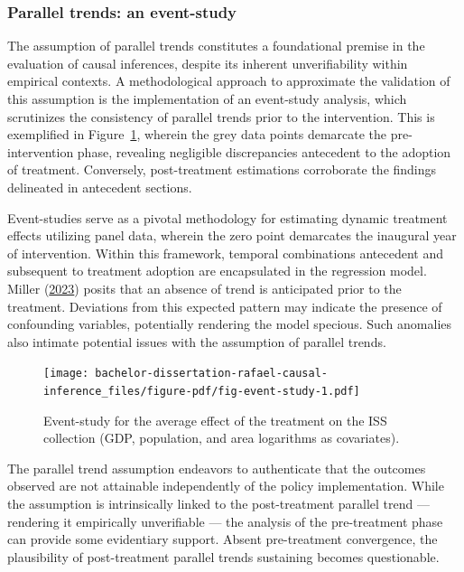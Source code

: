 \documentclass[12pt, a4paper, twoside]{article}
\numberwithin{equation}{subsection} %
\begin{document}
\hypertarget{sec-event-study}{%
\subsubsection{Parallel trends: an event-study}\label{sec-event-study}}

The assumption of parallel trends constitutes a foundational premise in
the evaluation of causal inferences, despite its inherent
unverifiability within empirical contexts. A methodological approach to
approximate the validation of this assumption is the implementation of
an event-study analysis, which scrutinizes the consistency of parallel
trends prior to the intervention. This is exemplified in
Figure~\ref{fig-event-study}, wherein the grey data points demarcate the
pre-intervention phase, revealing negligible discrepancies antecedent to
the adoption of treatment. Conversely, post-treatment estimations
corroborate the findings delineated in antecedent sections.

Event-studies serve as a pivotal methodology for estimating dynamic
treatment effects utilizing panel data, wherein the zero point
demarcates the inaugural year of intervention. Within this framework,
temporal combinations antecedent and subsequent to treatment adoption
are encapsulated in the regression model. Miller
(\protect\hyperlink{ref-Miller-2023}{2023}) posits that an absence of
trend is anticipated prior to the treatment. Deviations from this
expected pattern may indicate the presence of confounding variables,
potentially rendering the model specious. Such anomalies also intimate
potential issues with the assumption of parallel trends.

\begin{figure}[H]

{\centering \texttt{[image: bachelor-dissertation-rafael-causal-inference\_files/figure-pdf/fig-event-study-1.pdf]}

}

\caption{\label{fig-event-study}Event-study for the average effect of
the treatment on the ISS collection (GDP, population, and area
logarithms as covariates).}

\end{figure}

The parallel trend assumption endeavors to authenticate that the
outcomes observed are not attainable independently of the policy
implementation. While the assumption is intrinsically linked to the
post-treatment parallel trend --- rendering it empirically unverifiable
--- the analysis of the pre-treatment phase can provide some evidentiary
support. Absent pre-treatment convergence, the plausibility of
post-treatment parallel trends sustaining becomes questionable.
\end{document}
